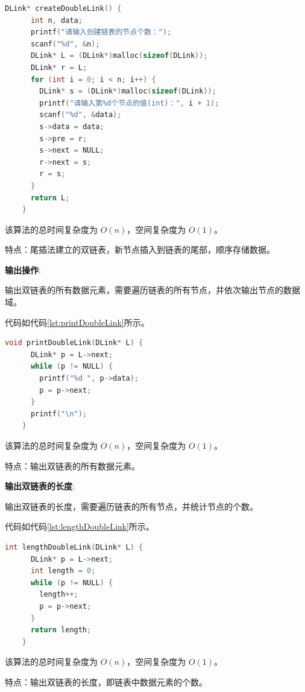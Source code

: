 \documentclass[lang=cn,newtx,10pt,scheme=chinese]{../elegantbook}
\begin{document}
  \begin{lstlisting}[language=C++, caption={尾插法建立双链表示例代码}, label={lst:tailInsertDouble}]
    DLink* createDoubleLink() {
      int n, data;
      printf("请输入创建链表的节点个数：");
      scanf("%d", &n);
      DLink* L = (DLink*)malloc(sizeof(DLink));
      DLink* r = L;
      for (int i = 0; i < n; i++) {
        DLink* s = (DLink*)malloc(sizeof(DLink));
        printf("请输入第%d个节点的值(int)：", i + 1);
        scanf("%d", &data);
        s->data = data;
        s->pre = r;
        s->next = NULL;
        r->next = s;
        r = s;
      }
      return L;
    }
  \end{lstlisting}
  该算法的总时间复杂度为 $O(n)$，空间复杂度为 $O(1)$。

  特点：尾插法建立的双链表，新节点插入到链表的尾部，顺序存储数据。

  \textbf{输出操作}:

  输出双链表的所有数据元素，需要遍历链表的所有节点，并依次输出节点的数据域。

  代码如代码\ref{lst:printDoubleLink}所示。

  \begin{lstlisting}[language=C++, caption={输出双链表示例代码}, label={lst:printDoubleLink}]
    void printDoubleLink(DLink* L) {
      DLink* p = L->next;
      while (p != NULL) {
        printf("%d ", p->data);
        p = p->next;
      }
      printf("\n");
    }
  \end{lstlisting}

  该算法的总时间复杂度为 $O(n)$，空间复杂度为 $O(1)$。

  特点：输出双链表的所有数据元素。

  \textbf{输出双链表的长度}:

  输出双链表的长度，需要遍历链表的所有节点，并统计节点的个数。

  代码如代码\ref{lst:lengthDoubleLink}所示。

  \begin{lstlisting}[language=C++, caption={输出双链表长度示例代码}, label={lst:lengthDoubleLink}]
    int lengthDoubleLink(DLink* L) {
      DLink* p = L->next;
      int length = 0;
      while (p != NULL) {
        length++;
        p = p->next;
      }
      return length;
    }
  \end{lstlisting}

  该算法的总时间复杂度为 $O(n)$，空间复杂度为 $O(1)$。

  特点：输出双链表的长度，即链表中数据元素的个数。
\end{document}

